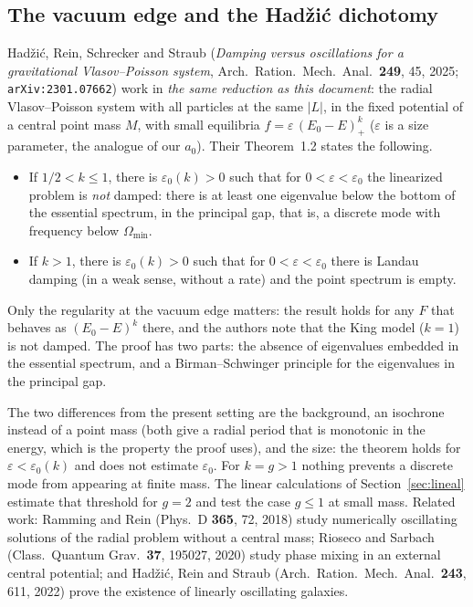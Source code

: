 \documentclass[11pt,a4paper]{article}
\begin{document}
\subsection{The vacuum edge and the Hadžić dichotomy}
\label{sec:borde}

Hadžić, Rein, Schrecker and Straub (\emph{Damping versus oscillations for a
gravitational Vlasov--Poisson system}, Arch.\ Ration.\ Mech.\ Anal.\ \textbf{249}, 45, 2025;
\texttt{arXiv:2301.07662}) work in \emph{the same reduction as this document}: the radial
Vlasov--Poisson system with all particles at the same $|L|$, in the fixed potential of a
central point mass $M$, with small equilibria $f=\varepsilon\,(E_0-E)_+^k$ ($\varepsilon$ is a size
parameter, the analogue of our $a_0$). Their Theorem~1.2 states the following.
\begin{itemize}
\item If $1/2<k\le1$, there is $\varepsilon_0(k)>0$ such that for $0<\varepsilon<\varepsilon_0$ the
linearized problem is \emph{not} damped: there is at least one eigenvalue below the bottom
of the essential spectrum, in the principal gap, that is, a discrete mode with frequency
below $\Omega_{\min}$.
\item If $k>1$, there is $\varepsilon_0(k)>0$ such that for $0<\varepsilon<\varepsilon_0$ there is Landau
damping (in a weak sense, without a rate) and the point spectrum is empty.
\end{itemize}
Only the regularity at the vacuum edge matters: the result holds for any $F$ that behaves
as $(E_0-E)^k$ there, and the authors note that the King model ($k=1$) is not damped. The
proof has two parts: the absence of eigenvalues embedded in the essential spectrum, and
a Birman--Schwinger principle for the eigenvalues in the principal gap.

The two differences from the present setting are the background, an isochrone instead
of a point mass (both give a radial period that is monotonic in the energy, which is the
property the proof uses), and the size: the theorem holds for $\varepsilon<\varepsilon_0(k)$ and does
not estimate $\varepsilon_0$. For $k=g>1$ nothing prevents a discrete mode from appearing at
finite mass. The linear calculations of Section~\ref{sec:lineal} estimate that threshold
for $g=2$ and test the case $g\le1$ at small mass. Related work: Ramming and Rein (Phys.\ D
\textbf{365}, 72, 2018) study numerically oscillating solutions of the radial problem
without a central mass; Rioseco and Sarbach (Class.\ Quantum Grav.\ \textbf{37}, 195027,
2020) study phase mixing in an external central potential; and Hadžić, Rein and Straub
(Arch.\ Ration.\ Mech.\ Anal.\ \textbf{243}, 611, 2022) prove the existence of linearly
oscillating galaxies.
\end{document}
